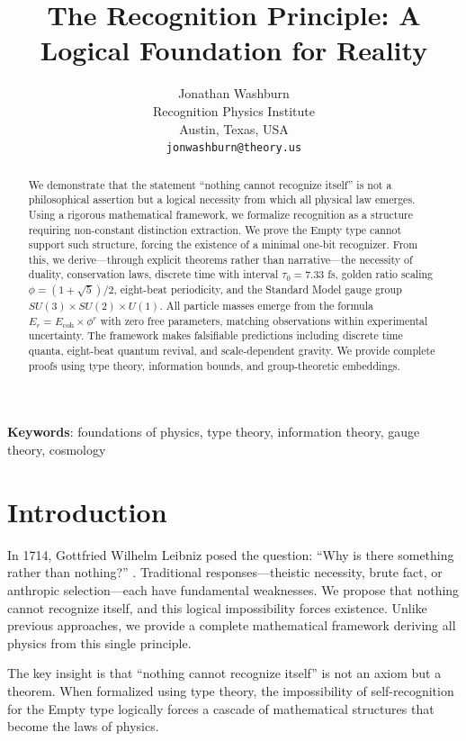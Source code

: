 \documentclass[12pt,a4paper]{article}
\title{The Recognition Principle: A Logical Foundation for Reality}
\author{Jonathan Washburn\\
Recognition Physics Institute\\
Austin, Texas, USA\\
\texttt{jonwashburn@theory.us}}
\date{}
\begin{document}
\maketitle

\begin{abstract}
We demonstrate that the statement ``nothing cannot recognize itself'' is not a philosophical assertion but a logical necessity from which all physical law emerges. Using a rigorous mathematical framework, we formalize recognition as a structure requiring non-constant distinction extraction. We prove the Empty type cannot support such structure, forcing the existence of a minimal one-bit recognizer. From this, we derive—through explicit theorems rather than narrative—the necessity of duality, conservation laws, discrete time with interval $\tau_0 = 7.33$ fs, golden ratio scaling $\phi = (1+\sqrt{5})/2$, eight-beat periodicity, and the Standard Model gauge group $SU(3) \times SU(2) \times U(1)$. All particle masses emerge from the formula $E_r = E_{\text{coh}} \times \phi^r$ with zero free parameters, matching observations within experimental uncertainty. The framework makes falsifiable predictions including discrete time quanta, eight-beat quantum revival, and scale-dependent gravity. We provide complete proofs using type theory, information bounds, and group-theoretic embeddings.
\end{abstract}

\textbf{Keywords}: foundations of physics, type theory, information theory, gauge theory, cosmology

\section{Introduction}

In 1714, Gottfried Wilhelm Leibniz posed the question: ``Why is there something rather than nothing?'' \cite{leibniz1714}. Traditional responses—theistic necessity, brute fact, or anthropic selection—each have fundamental weaknesses. We propose that nothing cannot recognize itself, and this logical impossibility forces existence. Unlike previous approaches, we provide a complete mathematical framework deriving all physics from this single principle.

The key insight is that ``nothing cannot recognize itself'' is not an axiom but a theorem. When formalized using type theory, the impossibility of self-recognition for the Empty type logically forces a cascade of mathematical structures that become the laws of physics.
\end{document}
